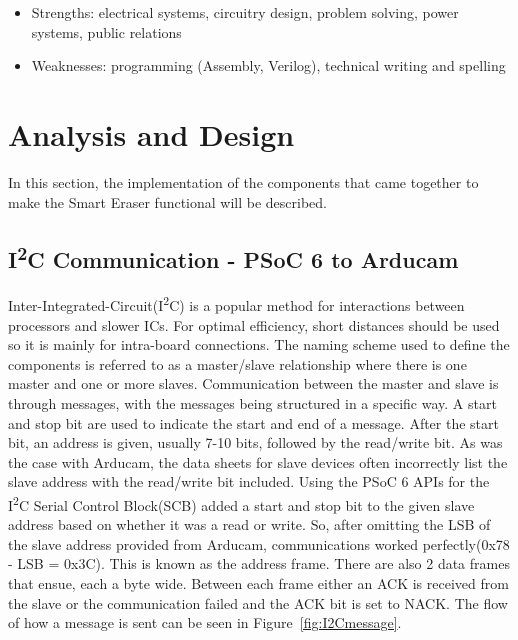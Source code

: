 	\begin{itemize}
	\item Strengths: electrical systems, circuitry design, problem solving, power systems, public relations
	\item Weaknesses: programming (Assembly, Verilog), technical writing and spelling
\end{itemize}


\section{Analysis and Design}

In this section, the implementation of the components that came together to make the Smart Eraser functional will be described.

\subsection{I\textsuperscript{2}C Communication - PSoC 6 to Arducam}
Inter-Integrated-Circuit(I\textsuperscript{2}C) is a popular method for interactions between processors and slower ICs. For optimal efficiency, short distances should be used so it is mainly for intra-board connections. The naming scheme used to define the components is referred to as a master/slave relationship where there is one master and one or more slaves. Communication between the master and slave is through messages, with the messages being structured in a specific way. A start and stop bit are used to indicate the start and end of a message. After the start bit, an address is given, usually 7-10 bits, followed by the read/write bit. As was the case with Arducam, the data sheets for slave devices often incorrectly list the slave address with the read/write bit included. Using the PSoC 6 APIs for the I\textsuperscript{2}C Serial Control Block(SCB) added a start and stop bit to the given slave address based on whether it was a read or write. So, after omitting the LSB of the slave address provided from Arducam, communications worked perfectly(0x78 - LSB = 0x3C). This is known as the address frame. There are also 2 data frames that ensue, each a byte wide. Between each frame either an ACK is received from the slave or the communication failed and the ACK bit is set to NACK. The flow of how a message is sent can be seen in Figure~\ref{fig:I2Cmessage}.


